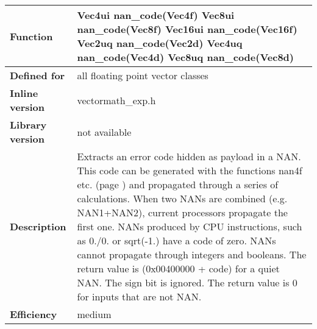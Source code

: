 \documentclass[vcl_manual.tex]{subfiles}
\begin{document}
\label{nanCode}
\begin{tabular}{|p{30mm}|p{120mm}|}
\hline
\bfseries Function & Vec4ui nan\_code(Vec4f) \newline
Vec8ui nan\_code(Vec8f)\newline
Vec16ui nan\_code(Vec16f)\newline
Vec2uq nan\_code(Vec2d)\newline
Vec4uq nan\_code(Vec4d)\newline
Vec8uq nan\_code(Vec8d) \\ \hline
\bfseries Defined for & all floating point vector classes \\ \hline
\bfseries Inline version & vectormath\_exp.h \\ \hline
\bfseries Library version & not available \\ \hline
\bfseries Description & Extracts an error code hidden as payload in a NAN. This code can be generated with the functions nan4f etc. (page \pageref{nan4f}) and propagated through a series of calculations. When two NANs are combined (e.g. NAN1+NAN2), current processors propagate the first one. NANs produced by CPU instructions, such as 0./0. or sqrt(-1.) have a code of zero. NANs cannot propagate through integers and booleans.\newline
The return value is (0x00400000 + code) for a quiet NAN.
The sign bit is ignored.\newline
The return value is 0 for inputs that are not NAN. \\ \hline
\bfseries Efficiency & medium \\ \hline
\end{tabular}
\end{document}
